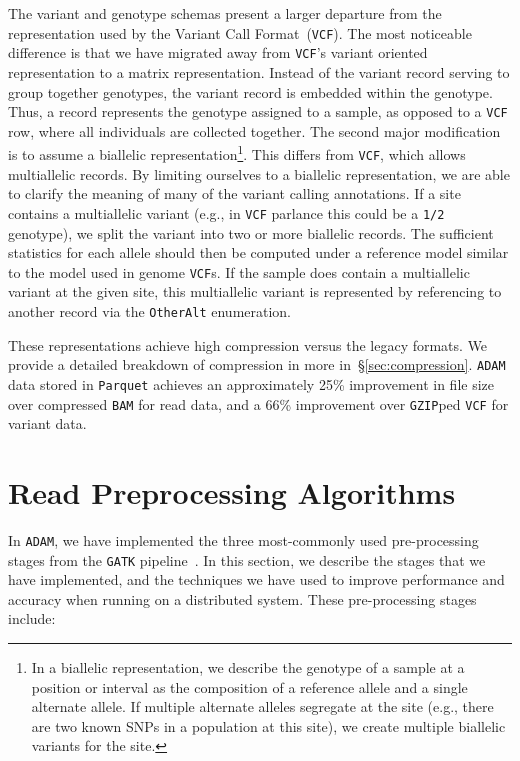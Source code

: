 \documentclass[masters]{ucbthesis}
\begin{document}
The variant and genotype schemas present a larger departure from the representation used by the Variant Call
Format~(\texttt{VCF}). The most noticeable difference is that we have migrated away from \texttt{VCF}'s variant oriented
representation to a matrix representation. Instead of the variant record serving to group together genotypes, the
variant record is embedded within the genotype. Thus, a record represents the genotype assigned to a sample,
as opposed to a \texttt{VCF} row, where all individuals are collected together. The second major modification is to assume
a biallelic representation\footnote{In a biallelic representation, we describe the genotype of a sample at a position or
interval as the composition of a reference allele and a single alternate allele. If multiple alternate alleles segregate at
the site (e.g., there are two known SNPs in a population at this site), we create multiple biallelic variants for the site.}.
This differs from \texttt{VCF}, which allows multiallelic records. By limiting
ourselves to a biallelic representation, we are able to clarify the meaning of many of the variant calling annotations. If a
site contains a multiallelic variant (e.g., in \texttt{VCF} parlance this could be a \texttt{1/2} genotype), we split the
variant into two or more biallelic records. The sufficient statistics for each allele should then be computed under
a reference model similar to the model used in genome \texttt{VCF}s. If the sample does contain a multiallelic variant at
the given site, this multiallelic variant is represented by referencing to another record via the \texttt{OtherAlt}
enumeration.

These representations achieve high compression versus the legacy formats. We provide a detailed breakdown of
compression in more in~\S\ref{sec:compression}. \texttt{ADAM} data stored in \texttt{Parquet} achieves an
approximately 25\% improvement in file size over compressed \texttt{BAM} for read data, and a 66\% improvement
over \texttt{GZIP}ped \texttt{VCF} for variant data.

\section{Read Preprocessing Algorithms}
\label{sec:read-preprocessing}

In \texttt{ADAM}, we have implemented the three most-commonly used pre-processing stages from the
\texttt{GATK} pipeline~\cite{depristo11}. In this section, we describe the stages that we have
implemented, and the techniques we have used to improve performance and accuracy when running on
a distributed system. These pre-processing stages include:
\end{document}
